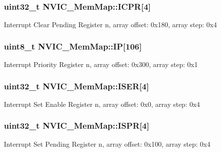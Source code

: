 \subsubsection[{I\+C\+P\+R}]{\setlength{\rightskip}{0pt plus 5cm}uint32\+\_\+t N\+V\+I\+C\+\_\+\+Mem\+Map\+::\+I\+C\+P\+R\mbox{[}4\mbox{]}}\label{struct_n_v_i_c___mem_map_a18f7154bcaf967d002d2cb1bd480a66a}
Interrupt Clear Pending Register n, array offset\+: 0x180, array step\+: 0x4 \hypertarget{struct_n_v_i_c___mem_map_a2c1a78a8c4dc2c05595641b28e771dee}{}
\subsubsection[{I\+P}]{\setlength{\rightskip}{0pt plus 5cm}uint8\+\_\+t N\+V\+I\+C\+\_\+\+Mem\+Map\+::\+I\+P\mbox{[}106\mbox{]}}\label{struct_n_v_i_c___mem_map_a2c1a78a8c4dc2c05595641b28e771dee}
Interrupt Priority Register n, array offset\+: 0x300, array step\+: 0x1 \hypertarget{struct_n_v_i_c___mem_map_abd212d27ccda188473e4e918f0cc8aff}{}
\subsubsection[{I\+S\+E\+R}]{\setlength{\rightskip}{0pt plus 5cm}uint32\+\_\+t N\+V\+I\+C\+\_\+\+Mem\+Map\+::\+I\+S\+E\+R\mbox{[}4\mbox{]}}\label{struct_n_v_i_c___mem_map_abd212d27ccda188473e4e918f0cc8aff}
Interrupt Set Enable Register n, array offset\+: 0x0, array step\+: 0x4 \hypertarget{struct_n_v_i_c___mem_map_a1067a671b702e7fac08c0733131e8454}{}
\subsubsection[{I\+S\+P\+R}]{\setlength{\rightskip}{0pt plus 5cm}uint32\+\_\+t N\+V\+I\+C\+\_\+\+Mem\+Map\+::\+I\+S\+P\+R\mbox{[}4\mbox{]}}\label{struct_n_v_i_c___mem_map_a1067a671b702e7fac08c0733131e8454}
Interrupt Set Pending Register n, array offset\+: 0x100, array step\+: 0x4 \hypertarget{struct_n_v_i_c___mem_map_a417658a729224de65052153f5c2cc419}{}
